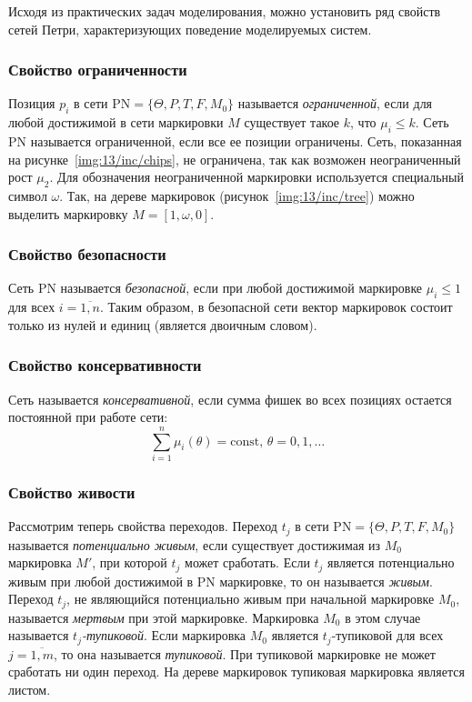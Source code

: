 Исходя из практических задач моделирования, можно установить ряд свойств сетей Петри, характеризующих поведение моделируемых систем.

\subsubsection{Свойство ограниченности}

Позиция $p_i$ в сети ${\text{PN} = \{\Theta, P, T, F, M_0\}}$ называется \textit{ограниченной}, если для любой достижимой в сети маркировки $M$ существует такое $k$, что ${\mu_i\leqslant k}$. Сеть PN называется ограниченной, если все ее позиции ограничены. Сеть, показанная на рисунке~\ref{img:13/inc/chips}, не ограничена, так как возможен неограниченный рост $\mu_2$. Для обозначения неограниченной маркировки используется специальный символ $\omega$. Так, на дереве маркировок (рисунок~\ref{img:13/inc/tree}) можно выделить маркировку ${M = [1, \omega, 0]}$.

\subsubsection{Свойство безопасности} 

Сеть PN называется \textit{безопасной}, если при любой достижимой маркировке ${\mu_i\leqslant 1}$ для всех ${i = \overline{1, n}}$. Таким образом, в безопасной сети вектор маркировок состоит только из нулей и единиц (является двоичным словом).

\subsubsection{Свойство консервативности}

Сеть называется \textit{консервативной}, если сумма фишек во всех позициях остается постоянной при работе сети:
%
\begin{equation*}
    \sum\limits_{i = 1}^n\mu_i(\theta) = \text{const},\, \theta = 0, 1, \dots
\end{equation*}
%
\subsubsection{Свойство живости}

Рассмотрим теперь свойства переходов. Переход $t_j$ в сети ${\text{PN} = \{ \Theta, P, T, F, M_0 \}}$ называется \textit{потенциально живым}, если существует достижимая из $M_0$ маркировка $M'$, при которой $t_j$ может сработать. Если $t_j$ является потенциально живым при любой достижимой в PN маркировке, то он называется \textit{живым}. Переход $t_j$, не являющийся потенциально живым при начальной маркировке $M_0$, называется \textit{мертвым} при этой маркировке. Маркировка $M_0$ в этом случае называется \textit{$t_j$-тупиковой}. Если маркировка $M_0$ является $t_j$-тупиковой для всех ${j = \overline{1, m}}$, то она называется \textit{тупиковой}. При тупиковой маркировке не может сработать ни один переход. На дереве маркировок тупиковая маркировка является листом.

